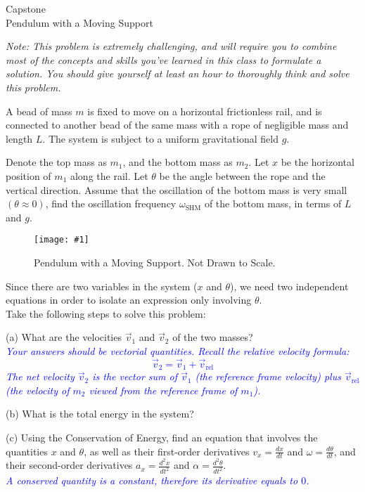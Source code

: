 \documentclass[11pt]{article}
\newcommand{\fig}[4]{
    \begin{figure}[H]
        \centering
        \texttt{[image: \#1]}
        \caption{#2}
        \label{exp4fit}
    \end{figure}
}
\theoremstyle{gangnamstyle}{\newtheorem{definition}{Definition}[]}
\theoremstyle{gangnamstyle}{\newtheorem{example}{Example}[]}
\theoremstyle{gangnamstyle}{\newtheorem{problem}{Problem}[]}
\begin{document}
\normalfont
\pagestyle{pages}


\begin{center}
\vspace{3in}
{\Large Capstone } \\ [0.05in]
Pendulum with a Moving Support \\ [-0.5in]
\end{center}

\textit{Note: This problem is extremely challenging, and will require you to combine most of the concepts and skills you've learned in this class to formulate a solution. You should give yourself at least an hour to thoroughly think and solve this problem.} 

A bead of mass $m$ is fixed to move on a horizontal frictionless rail, and is connected to another bead of the same mass with a rope of negligible mass and length $L$. The system is subject to a uniform gravitational field $g$. 

Denote the top mass as $m_1$, and the bottom mass as $m_2$. Let $x$ be the horizontal position of $m_1$ along the rail. Let $\theta$ be the angle between the rope and the vertical direction. Assume that the oscillation of the bottom mass is very small $(\theta \approx 0)$, find the oscillation frequency $\omega_{\text{SHM}}$ of the bottom mass, in terms of $L$ and $g$. 

\fig{figs/caps/pendulum.png}{Pendulum with a Moving Support. Not Drawn to Scale.}{0.85}{0}

Since there are two variables in the system ($x$ and $\theta$), we need two independent equations in order to isolate an expression only involving $\theta$. \\
Take the following steps to solve this problem: 

(a) What are the velocities $\Vec{v}_{1}$ and $\Vec{v}_{2}$ of the two masses? \\
\textcolor{blue}{
\textit{Your answers should be vectorial quantities. Recall the relative velocity formula: }
\[ \Vec{v}_2 = \Vec{v}_1 + \Vec{v}_{\text{rel}} \]
\textit{The net velocity $\Vec{v}_2$ is the vector sum of $\Vec{v}_1$ (the reference frame velocity) plus $\Vec{v}_{\text{rel}}$ (the velocity of $m_2$ viewed from the reference frame of $m_1$).}}

(b) What is the total energy in the system? 

(c) Using the Conservation of Energy, find an equation that involves the quantities $x$ and $\theta$, as well as their first-order derivatives $v_x = \frac{dx}{dt}$ and $\omega = \frac{d\theta}{dt}$, and their second-order derivatives $a_x = \frac{d^2x}{dt^2}$ and $\alpha = \frac{d^2\theta}{dt^2}$. \\
\textcolor{blue}{
\textit{A conserved quantity is a constant, therefore its derivative equals to $0$.}}
\end{document}
